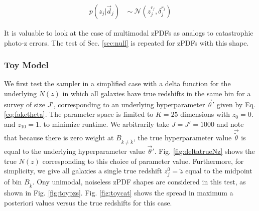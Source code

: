 \documentclass[preprint]{aastex}
\newcommand{\textul}{\underline}
\begin{document}
\begin{eqnarray}
\label{eq:zspread}
p(z_{j}|\vec{d}_{j})\ &\sim\ \mathcal{N}(z^{r_{j}}_{j},\delta^{r_{j}}_{j})
\end{eqnarray}

It is valuable to look at the case of multimodal zPDFs as analogs to catastrophic photo-z errors.  The test of Sec. \ref{sec:null} is repeated for zPDFs with this shape.  %

%

\clearpage
\subsubsection{Toy Model}
\label{sec:fake}

We first test the sampler in a simplified case with a delta function for the underlying $N(z)$ in which all galaxies have true redshifts in the same bin for a survey of size $J'$, corresponding to an underlying hyperparameter $\vec{\theta}'$ given by Eq. \ref{eq:faketheta}.  The parameter space is limited to $K=25$ dimensions with $z_{0}=0.$ and $z_{10}=1.$ to minimize runtime.  We arbitrarily take $J=J'=1000$ and note that because there is zero weight at $B_{k\neq\tilde{k}}$, the true hyperparameter value $\vec{\tilde{\theta}}$ is equal to the underlying hyperparameter value $\vec{\theta}'$.  Fig. \ref{fig:deltatrueNz} shows the true $N(z)$ corresponding to this choice of parameter value.  Furthermore, for simplicity, we give all galaxies a single true redshift $z_{j}^{0}=\tilde{z}$ equal to the midpoint of bin $B_{\tilde{k}}$.  Ony unimodal, noiseless zPDF shapes are considered in this test, as shown in Fig. \ref{fig:toypzs}.  Fig. \ref{fig:toycat} shows the spread in maximum a posteriori values versus the true redshifts for this case.
\end{document}
